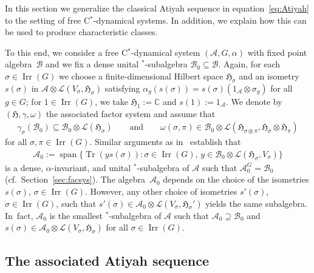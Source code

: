 \documentclass[pdftex]{sigma}
\numberwithin{equation}{section}
\newcommand*{\C}{\mathbb C}		%
\newcommand*{\tensor}{\otimes}		%
\DeclareMathOperator{\Span}{span}
\DeclareMathOperator{\Tr}{Tr}		%
\newcommand*{\Star}{$^*$\nobreakdash}
\newcommand*{\hilb}{\mathfrak}		%
\newcommand*{\alg}{\mathcal}		%
\newcommand*{\hH}{\hilb{H}}			%
\newcommand*{\one}{1}				%
\newcommand*{\aA}{\alg{A}}			%
\newcommand*{\aB}{\alg{B}} 			%
\newcommand*{\End}{\mathcal{L}} %
\DeclareMathOperator{\Irrep}{Irr} 			%
\begin{document}
In this section we generalize the classical Atiyah sequence in equation~\eqref{eq:Atiyah} to the setting of free C\Star-dynamical systems.
In addition, we explain how this can be used to produce characteristic classes.

To this end, we consider a free C\Star-dynamical system $(\aA,G,\alpha)$ with fixed point algebra~$\aB$ and we fix a dense unital \Star-subalgebra $\aB_0 \subseteq \aB$.
Again, for each $\sigma \in \Irrep(G)$ we choose a finite-dimensional Hilbert space $\hH_\sigma$ and an isometry $s(\sigma)$ in $\aA \tensor \End(V_\sigma,\hH_\sigma)$ satisfying $\alpha_g(s(\sigma))=s(\sigma) (\one_\aA \tensor \sigma_g)$ for all $g \in G$; for $1 \in \Irrep(G)$, we take $\hH_1 := \C$ and $s(1) := \one_\aA$.
We denote by $(\hH, \gamma, \omega)$ the associated factor system and assume that
\begin{gather*}
	\gamma_\sigma(\aB_0) \subseteq \aB_0 \tensor \End(\hH_\sigma)
	\qquad \text{and}
\qquad
\omega(\sigma, \pi) \in \aB_0 \tensor \End(\hH_{\sigma \tensor \pi},\hH_\sigma \tensor \hH_\pi)
\end{gather*}
for all $\sigma, \pi \in \Irrep(G)$.
Similar arguments as in~\cite[Section~5.1]{SchWa20} establish that
\begin{gather*}
	\aA_0 := \Span \bigl\{ \Tr ( y s(\sigma) ) \colon \sigma \in \Irrep(G), \, y \in \aB_0 \tensor \End(\hH_\sigma,V_\sigma) \bigr\}
\end{gather*}
is a dense, $\alpha$-invariant, and unital \Star-subalgebra of $\aA$ such that $\aA_0^G = \aB_0$ (cf.\ Section~\ref{sec:facsys}).
The algebra~$\aA_0$ depends on the choice of the isometries $s(\sigma)$, $\sigma \in \Irrep(G)$.
However, any other choice of isometries $s'(\sigma)$, $\sigma \in \Irrep(G)$, such that $s'(\sigma) \in \aA_0 \tensor \End(V_\sigma, \hH_\sigma')$ yields the same subalgebra.
In~fact, $\aA_0$ is the smallest \Star-subalgebra of $\aA$ such that $\aA_0 \supseteq \aB_0$ and $s(\sigma) \in \aA_0 \tensor \End(V_\sigma, \hH_\sigma)$ for all $\sigma \in \Irrep(G)$.

\subsection{The associated Atiyah sequence}
\end{document}
